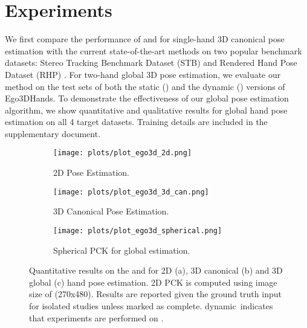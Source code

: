 \documentclass[10pt,twocolumn,letterpaper]{article}
\begin{document}
\section{Experiments}\label{sec:experiments}
\indent We first compare the performance of \textit{} and \textit{} for single-hand 3D canonical pose estimation with the current state-of-the-art methods on two popular benchmark datasets: Stereo Tracking Benchmark Dataset (STB) \cite{Zhang} and Rendered Hand Pose Dataset (RHP) \cite{Zimmermann}. For two-hand global 3D pose estimation, we evaluate our method on the test sets of both the static () and the dynamic () versions of Ego3DHands. To demonstrate the effectiveness of our global pose estimation algorithm, we show quantitative and qualitative results for global hand pose estimation on all 4 target datasets. Training details are included in the supplementary document.
\begin{figure*}[t]
 \centering
  \begin{subfigure}[t]{0.32\linewidth}
    \texttt{[image: plots/plot\_ego3d\_2d.png]}
    \caption{2D Pose Estimation.}\label{fig:ego3d_eval1}
  \end{subfigure}
  \begin{subfigure}[t]{0.32\linewidth}
    \texttt{[image: plots/plot\_ego3d\_3d\_can.png]}
    \caption{3D Canonical Pose Estimation.}\label{fig:ego3d_eval2}
  \end{subfigure}
  \begin{subfigure}[t]{0.32\linewidth}
    \texttt{[image: plots/plot\_ego3d\_spherical.png]}
    \caption{Spherical PCK for global estimation.}\label{fig:ego3d_eval3}
  \end{subfigure}
  \vspace{0.2cm}
  \caption{Quantitative results on the  and  for 2D (a), 3D canonical (b) and 3D global (c) hand pose estimation. 2D PCK is computed using image size of (270x480). Results are reported given the ground truth input for isolated studies unless marked as \textquotedbl *complete\textquotedbl {}. \textquotedbl dynamic\textquotedbl \ indicates that experiments are performed on .}
\label{fig:ego3d_eval}
\end{figure*}
\end{document}

